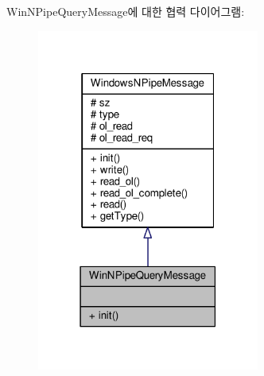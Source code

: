 Win\+N\+Pipe\+Query\+Message에 대한 협력 다이어그램\+:
\nopagebreak
\begin{figure}[H]
\begin{center}
\leavevmode
\includegraphics[width=207pt]{class_win_n_pipe_query_message__coll__graph}
\end{center}
\end{figure}
